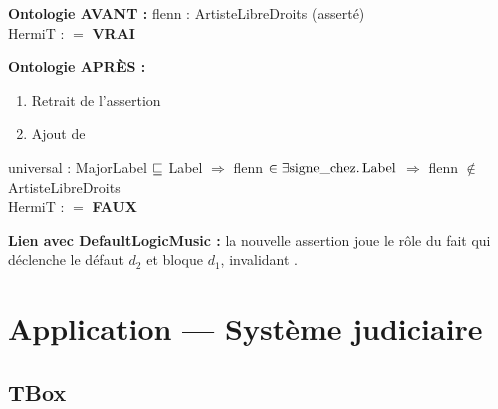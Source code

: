 \begin{tcolorbox}[resultbox, title={R10 — Non-monotonie pour flenn}]
\textbf{Ontologie AVANT :} flenn : ArtisteLibreDroits (asserté) \\
\quad HermiT :  $=$ \textbf{VRAI}

\medskip
\textbf{Ontologie APRÈS :}
\begin{enumerate}
  \item Retrait de l'assertion 
  \item Ajout de 
\end{enumerate}
\quad universal : MajorLabel $\sqsubseteq$ Label
$\Rightarrow$ flenn $\in \exists \text{signe\_chez}.\,\text{Label}$
$\Rightarrow$ flenn $\notin$ ArtisteLibreDroits \\
\quad HermiT :  $=$ \textbf{FAUX}

\medskip
\textbf{Lien avec DefaultLogicMusic :}
la nouvelle assertion 
joue le rôle du fait  qui déclenche le défaut $d_2$
et bloque $d_1$, invalidant .
\end{tcolorbox}

\section{Application — Système judiciaire}

\subsection{TBox}

